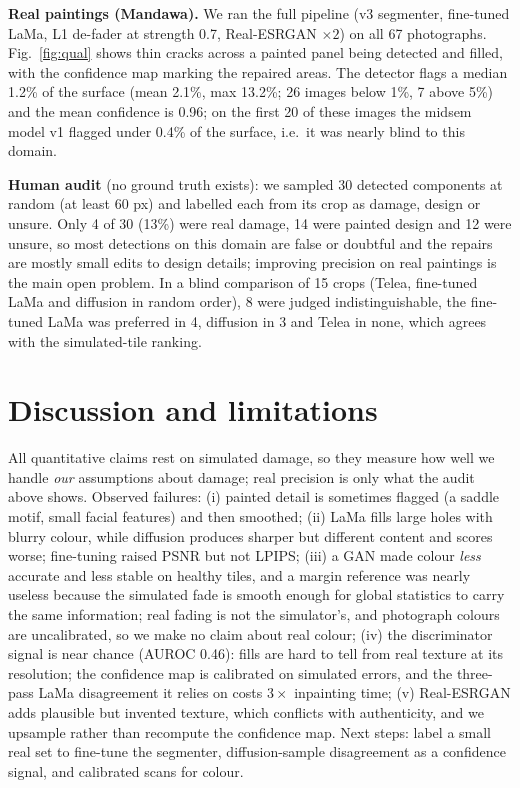 \documentclass[11pt,a4paper,twocolumn]{article}
\begin{document}
\textbf{Real paintings (Mandawa).} We ran the full pipeline (v3 segmenter, fine-tuned LaMa, L1 de-fader at strength 0.7, Real-ESRGAN $\times2$) on all 67 photographs. Fig.~\ref{fig:qual} shows thin cracks across a painted panel being detected and filled, with the confidence map marking the repaired areas. The detector flags a median 1.2\% of the surface (mean 2.1\%, max 13.2\%; 26 images below 1\%, 7 above 5\%) and the mean confidence is 0.96; on the first 20 of these images the midsem model v1 flagged under 0.4\% of the surface, i.e.\ it was nearly blind to this domain. 

\noindent\textbf{Human audit} (no ground truth exists): we sampled 30 detected components at random (at least 60 px) and labelled each from its crop as damage, design or unsure. Only 4 of 30 (13\%) were real damage, 14 were painted design and 12 were unsure, so most detections on this domain are false or doubtful and the repairs are mostly small edits to design details; improving precision on real paintings is the main open problem. In a blind comparison of 15 crops (Telea, fine-tuned LaMa and diffusion in random order), 8 were judged indistinguishable, the fine-tuned LaMa was preferred in 4, diffusion in 3 and Telea in none, which agrees with the simulated-tile ranking.

\section{Discussion and limitations}
All quantitative claims rest on simulated damage, so they measure how well we handle \emph{our} assumptions about damage; real precision is only what the audit above shows. Observed failures: (i) painted detail is sometimes flagged (a saddle motif, small facial features) and then smoothed; (ii) LaMa fills large holes with blurry colour, while diffusion produces sharper but different content and scores worse; fine-tuning raised PSNR but not LPIPS; (iii) a GAN made colour \emph{less} accurate and less stable on healthy tiles, and a margin reference was nearly useless because the simulated fade is smooth enough for global statistics to carry the same information; real fading is not the simulator's, and photograph colours are uncalibrated, so we make no claim about real colour; (iv) the discriminator signal is near chance (AUROC 0.46): fills are hard to tell from real texture at its resolution; the confidence map is calibrated on simulated errors, and the three-pass LaMa disagreement it relies on costs $3\times$ inpainting time; (v) Real-ESRGAN adds plausible but invented texture, which conflicts with authenticity, and we upsample rather than recompute the confidence map. Next steps: label a small real set to fine-tune the segmenter, diffusion-sample disagreement as a confidence signal, and calibrated scans for colour.
\end{document}
